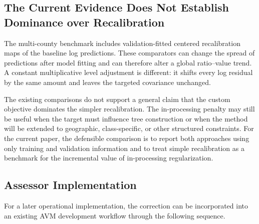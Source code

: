 \documentclass[10pt]{article}
\theoremstyle{definition}
\newcommand{\1}{\mathbf{1}}
\newcommand{\advisorchange}[1]{{\color{blue}#1}}
\newcommand{\oldtext}[1]{\textcolor{blue}{\sout{#1}}}
\newcommand{\newtext}[1]{\textcolor{impGreen}{#1}}
\begin{document}
\subsection{The Current Evidence Does Not Establish Dominance over Recalibration}
\label{subsec:scaling_results}

\advisorchange{The multi-county benchmark includes validation-fitted centered recalibration maps} of the baseline log predictions. These comparators can change the spread of predictions after model fitting and can therefore alter a global ratio--value trend. A constant multiplicative level adjustment is different: it shifts every log residual by the same amount and leaves the targeted covariance unchanged.

The existing comparisons do not support a general claim that the custom objective dominates the simpler recalibration. The in-processing penalty may still be useful when the target must influence tree construction or when the method will be extended to geographic, class-specific, or other structured constraints. 
\newtext{For the current paper, the defensible comparison is to report both approaches using only training and validation information and to treat simple recalibration as a benchmark for the incremental value of in-processing regularization.}

\subsection{Assessor Implementation}
\label{sec:implementation_workflow}

\newtext{For a later operational implementation, the correction can be incorporated into an existing AVM development workflow through the following sequence.}
\end{document}
